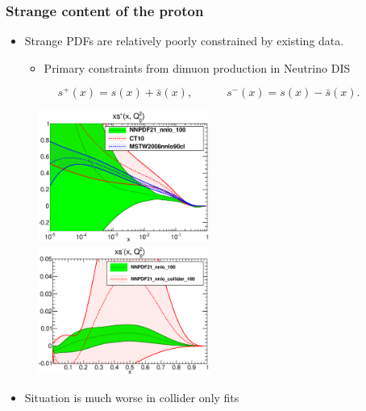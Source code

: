 \documentclass[10pt]{beamer}
\newcommand{\be}{\begin{equation*}}
\newcommand{\ee}{\end{equation*}}
\begin{document}
\begin{frame}
\frametitle{ Strange content of the proton }
\begin{itemize}
\item<1-> Strange PDFs are relatively poorly constrained by existing data.
\begin{itemize}
\item<1-> Primary constraints from dimuon production in Neutrino DIS
\end{itemize}
\end{itemize}

\small {\be s^+(x) = s(x) + \bar{s}(x), \quad \quad\quad s^-(x) = s(x) - \bar{s}(x). \ee}
 \begin{figure}[b!]
    \begin{center}
      \includegraphics[width=0.50\textwidth]{pdf_xsplus_log_band_comparison_others.eps}
      \includegraphics[width=0.50\textwidth]{pdf_xsminus_band_comparison.eps}
    \end{center}
    \vskip-0.5cm
    \label{fig:pdf-jets}
\end{figure}


\begin{itemize}
\item<1-> Situation is much worse in collider only fits
\end{itemize}

\end{frame}
\end{document}
